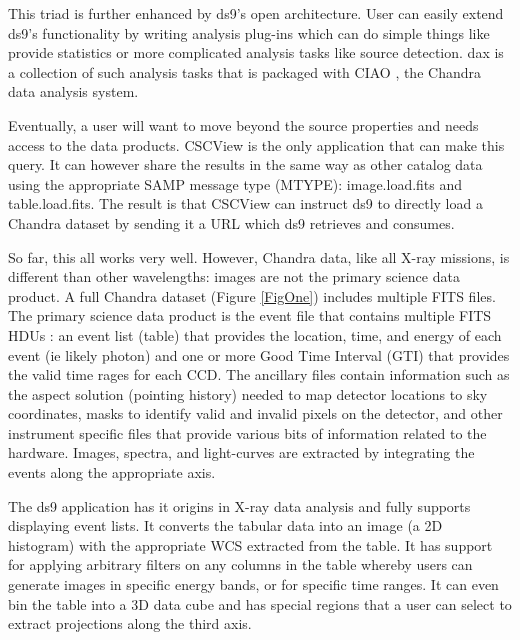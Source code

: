  This triad is further enhanced by ds9's open architecture.  User can easily 
extend ds9's 
functionality by writing analysis plug-ins which can do simple things like provide
statistics or more complicated analysis tasks like source detection.  dax \citep{2011ASPC..442..629G} 
is a collection of such analysis tasks that is packaged with CIAO \citep{2006SPIE.6270E..60F},
the Chandra data analysis system.


Eventually, a user will want to move beyond the source properties and 
needs access to the data products.  CSCView is the only application that
can make this query.  It can however share the results in the 
same way as other catalog data using the
appropriate SAMP message type (MTYPE): image.load.fits and table.load.fits.
The result is that CSCView can instruct ds9 to directly load a Chandra dataset
by sending it a URL which ds9 retrieves and consumes.



So far, this all works very well.  However, Chandra data, like all X-ray 
missions, is different than other wavelengths:  images are not the primary
science data product.
A full Chandra  dataset (Figure \ref{FigOne}) includes multiple FITS files. 
The primary science data product is the event file that contains multiple
FITS HDUs :  an event list (table) that provides the location, time, and
energy of each event (ie likely photon) and one or more Good Time Interval (GTI)
that provides the valid time rages for each CCD.  The ancillary files 
contain information such as the aspect solution (pointing history) needed
to map detector locations to sky coordinates, masks to identify valid and
invalid pixels on the detector, and other instrument specific files that
provide various bits of information related to the hardware.  Images,
spectra, and light-curves are extracted by integrating the events along
the appropriate axis.


The ds9 application has it origins in X-ray data analysis 
and fully supports displaying event lists.  It converts the tabular data into
an image (a 2D histogram) with the appropriate WCS extracted from the table. 
It has support for applying arbitrary filters on any columns in the table
whereby users can generate images in specific energy bands, or for specific 
time ranges.  It can even bin the table into a 3D data cube and has special
regions that a user can select to extract projections along the third axis.

